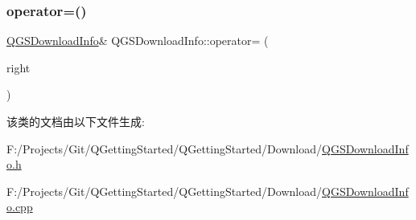\mbox{\label{class_q_g_s_download_info_a8440aa99b02668e7895bf0d37ef66124}} 
\subsubsection{\texorpdfstring{operator=()}{operator=()}\hspace{0.1cm}{\footnotesize\ttfamily [2/2]}}
{\footnotesize\ttfamily \mbox{\hyperlink{class_q_g_s_download_info}{Q\+G\+S\+Download\+Info}}\& Q\+G\+S\+Download\+Info\+::operator= (\begin{DoxyParamCaption}\item[{\mbox{\hyperlink{class_q_g_s_download_info}{Q\+G\+S\+Download\+Info}} \&\&}]{right }\end{DoxyParamCaption})\hspace{0.3cm}{\ttfamily [default]}}



该类的文档由以下文件生成\+:\begin{DoxyCompactItemize}
\item 
F\+:/\+Projects/\+Git/\+Q\+Getting\+Started/\+Q\+Getting\+Started/\+Download/\mbox{\hyperlink{_q_g_s_download_info_8h}{Q\+G\+S\+Download\+Info.\+h}}\item 
F\+:/\+Projects/\+Git/\+Q\+Getting\+Started/\+Q\+Getting\+Started/\+Download/\mbox{\hyperlink{_q_g_s_download_info_8cpp}{Q\+G\+S\+Download\+Info.\+cpp}}\end{DoxyCompactItemize}
